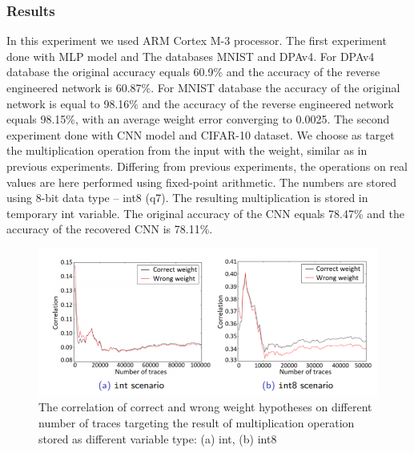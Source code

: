 \subsubsection{Results}
In this experiment we used ARM Cortex M-3 processor. 
\newline
The first experiment done with MLP model and The databases MNIST and DPAv4.
For DPAv4 database the original accuracy equals 60.9\% and the accuracy of the reverse engineered network is 60.87\%.
For MNIST database the accuracy of the original network is equal to 98.16\% and the accuracy of the reverse engineered network equals 98.15\%, with an average weight error converging to 0.0025.
\newline
The second experiment done with CNN model and CIFAR-10 dataset. We choose as target the multiplication operation from the input with the weight, similar as in previous experiments. Differing from previous experiments, the operations on real values are here performed using fixed-point arithmetic. The numbers are stored using 8-bit data type – int8 (q7). The resulting multiplication is stored in temporary int variable. The original accuracy of the CNN equals 78.47\% and the
accuracy of the recovered CNN is 78.11\%.

\begin{figure}
    \centering
    \includegraphics[scale=0.5]{images/chapter8/int_int8.PNG}
    \caption{The correlation of correct and wrong weight hypotheses on different number of
traces targeting the result of multiplication operation stored as different variable type:
(a) int, (b) int8}
\end{figure}

